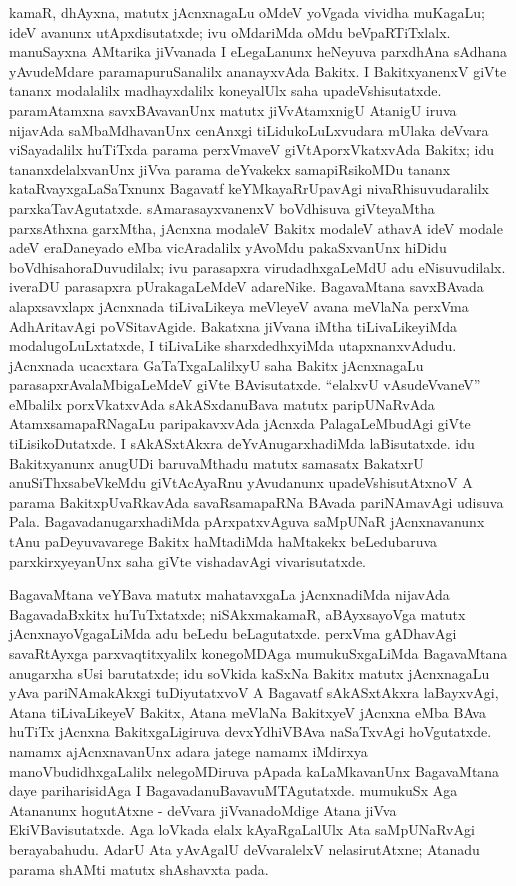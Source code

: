 kamaR, dhAyxna, matutx jAcnxnagaLu oMdeV yoVgada vividha muKagaLu; ideV avanunx utApxdisutatxde; ivu oMdariMda oMdu beVpaRTiTxlalx. manuSayxna AMtarika jiVvanada I eLegaLanunx heNeyuva parxdhAna sAdhana yAvudeMdare paramapuruSanalilx ananayxvAda Bakitx. I BakitxyanenxV giVte tananx modalalilx madhayxdalilx koneyalUlx saha upadeVshisutatxde. paramAtamxna savxBAvavanUnx matutx jiVvAtamxnigU AtanigU iruva nijavAda saMbaMdhavanUnx cenAnxgi tiLidukoLuLxvudara mUlaka deVvara viSayadalilx huTiTxda parama perxVmaveV giVtAporxVkatxvAda Bakitx; idu tananxdelalxvanUnx jiVva parama deYvakekx samapiRsikoMDu tananx kataRvayxgaLaSaTxnunx Bagavatf keYMkayaRrUpavAgi nivaRhisuvudaralilx parxkaTavAgutatxde. sAmarasayxvanenxV boVdhisuva giVteyaMtha parxsAthxna garxMtha, jAcnxna modaleV Bakitx modaleV athavA ideV modale adeV eraDaneyado eMba vicAradalilx yAvoMdu pakaSxvanUnx hiDidu boVdhisahoraDuvudilalx; ivu parasapxra virudadhxgaLeMdU adu eNisuvudilalx. iveraDU parasapxra pUrakagaLeMdeV adareNike. BagavaMtana savxBAvada alapxsavxlapx jAcnxnada tiLivaLikeya meVleyeV avana meVlaNa perxVma AdhAritavAgi poVSitavAgide. Bakatxna jiVvana iMtha tiLivaLikeyiMda modalugoLuLxtatxde, I tiLivaLike sharxdedhxyiMda utapxnanxvAdudu. jAcnxnada ucacxtara GaTaTxgaLalilxyU saha Bakitx jAcnxnagaLu parasapxrAvalaMbigaLeMdeV giVte BAvisutatxde. ``elalxvU vAsudeVvaneV'' eMbalilx porxVkatxvAda sAkASxdanuBava matutx paripUNaRvAda AtamxsamapaRNagaLu paripakavxvAda jAcnxda PalagaLeMbudAgi giVte tiLisikoDutatxde. I sAkASxtAkxra deYvAnugarxhadiMda laBisutatxde. idu Bakitxyanunx anugUDi baruvaMthadu matutx samasatx BakatxrU anuSiThxsabeVkeMdu giVtAcAyaRnu yAvudanunx upadeVshisutAtxnoV A parama BakitxpUvaRkavAda savaRsamapaRNa BAvada pariNAmavAgi udisuva Pala. BagavadanugarxhadiMda pArxpatxvAguva saMpUNaR jAcnxnavanunx tAnu paDeyuvavarege Bakitx haMtadiMda haMtakekx beLedubaruva parxkirxyeyanUnx saha giVte vishadavAgi vivarisutatxde.

BagavaMtana veYBava matutx mahatavxgaLa jAcnxnadiMda nijavAda BagavadaBxkitx huTuTxtatxde; niSAkxmakamaR, aBAyxsayoVga matutx jAcnxnayoVgagaLiMda adu beLedu beLagutatxde. perxVma gADhavAgi savaRtAyxga parxvaqtitxyalilx konegoMDAga mumukuSxgaLiMda BagavaMtana anugarxha sUsi barutatxde; idu soVkida kaSxNa Bakitx matutx jAcnxnagaLu yAva pari\-NAma\-kAkxgi tuDiyutatxvoV A Bagavatf sAkASxtAkxra laBayxvAgi, Atana tiLivaLikeyeV Bakitx, Atana meVlaNa BakitxyeV jAcnxna eMba BAva huTiTx jAcnxna BakitxgaLigiruva devxYdhiVBAva naSaTxvAgi hoVgutatxde. namamx ajAcnxnavanUnx adara jatege namamx iMdirxya manoVbudidhx\-gaLalilx nelegoMDiruva pApada kaLaMkavanUnx BagavaMtana daye pariharisidAga I BagavadanuBavavuMTAgutatxde. mumukuSx Aga Atananunx hogutAtxne - deVvara jiVvana\-doMdige Atana jiVva EkiVBavisutatxde. Aga loVkada elalx kAyaRgaLalUlx Ata saMpUNaRvAgi berayabahudu. AdarU Ata yAvAgalU deVvaralelxV nelasirutAtxne; Atanadu parama shAMti matutx shAshavxta pada.

